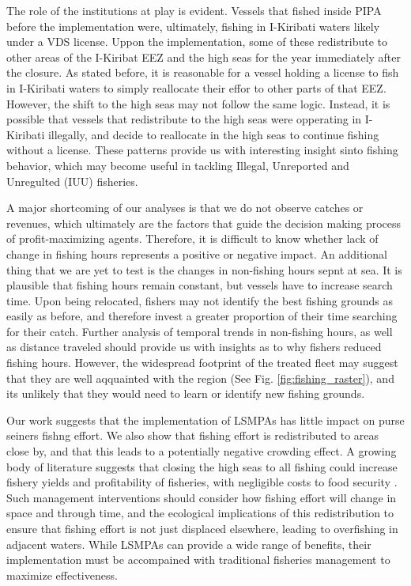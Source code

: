 \documentclass[11pt,]{article}
\begin{document}
The role of the institutions at play is evident. Vessels that fished
inside PIPA before the implementation were, ultimately, fishing in
I-Kiribati waters likely under a VDS license. Uppon the implementation,
some of these redistribute to other areas of the I-Kiribat EEZ and the
high seas for the year immediately after the closure. As stated before,
it is reasonable for a vessel holding a license to fish in I-Kiribati
waters to simply reallocate their effor to other parts of that EEZ.
However, the shift to the high seas may not follow the same logic.
Instead, it is possible that vessels that redistribute to the high seas
were opperating in I-Kiribati illegally, and decide to reallocate in the
high seas to continue fishing without a license. These patterns provide
us with interesting insight sinto fishing behavior, which may become
useful in tackling Illegal, Unreported and Unregulted (IUU) fisheries.

A major shortcoming of our analyses is that we do not observe catches or
revenues, which ultimately are the factors that guide the decision
making process of profit-maximizing agents. Therefore, it is difficult
to know whether lack of change in fishing hours represents a positive or
negative impact. An additional thing that we are yet to test is the
changes in non-fishing hours sepnt at sea. It is plausible that fishing
hours remain constant, but vessels have to increase search time. Upon
being relocated, fishers may not identify the best fishing grounds as
easily as before, and therefore invest a greater proportion of their
time searching for their catch. Further analysis of temporal trends in
non-fishing hours, as well as distance traveled should provide us with
insights as to why fishers reduced fishing hours. However, the
widespread footprint of the treated fleet may suggest that they are well
aqquainted with the region (See Fig. \ref{fig:fishing_raster}), and its
unlikely that they would need to learn or identify new fishing grounds.

Our work suggests that the implementation of LSMPAs has little impact on
purse seiners fishng effort. We also show that fishing effort is
redistributed to areas close by, and that this leads to a potentially
negative crowding effect. A growing body of literature suggests that
closing the high seas to all fishing could increase fishery yields and
profitability of fisheries, with negligible costs to food security
\citep{white_2014,sumaila_2015,sala_2018a,schiller_2018}. Such
management interventions should consider how fishing effort will change
in space and through time, and the ecological implications of this
redistribution to ensure that fishing effort is not just displaced
elsewhere, leading to overfishing in adjacent waters. While LSMPAs can
provide a wide range of benefits, their implementation must be
accompained with traditional fisheries management to maximize
effectiveness.
\end{document}
